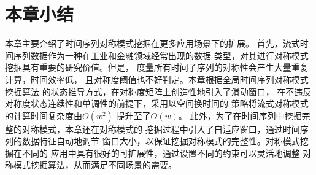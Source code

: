 


\section{本章小结}
本章主要介绍了时间序列对称模式挖掘在更多应用场景下的扩展。
首先，流式时间序列数据作为一种在工业和金融领域经常出现的数据
类型，对其进行对称模式挖掘具有重要的研究价值。但是，
度量所有时间子序列的对称性会产生大量重复计算，时间效率低，
且对称度阈值也不好判定。本章根据全局时间序列对称模式挖掘算法
的状态推导方式，在对称度矩阵上创造性地引入了滑动窗口，
在不违反对称度状态连续性和单调性的前提下，采用以空间换时间的
策略将流式对称模式的计算时间复杂度由$O\left(w^2\right)$
提升至了$O\left(w\right)$。
此外，为了在时间序列中挖掘完整的对称模式，本章还在对称模式的
挖掘过程中引入了自适应窗口，通过时间序列的数据特征自动地调节
窗口大小，以保证挖掘对称模式的完整性。对称模式挖掘在不同的
应用中具有很好的可扩展性，通过设置不同的约束可以灵活地调整
对称模式挖掘算法，从而满足不同场景的需要。







